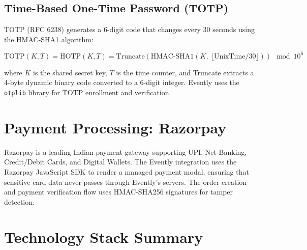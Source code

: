 \documentclass[12pt,a4paper]{report}
\begin{document}
\subsection{Time-Based One-Time Password (TOTP)}
TOTP (RFC 6238) generates a 6-digit code that changes every 30 seconds using the HMAC-SHA1 algorithm:

\begin{equation}
    \text{TOTP}(K, T) = \text{HOTP}(K, T) = \text{Truncate}\left(\text{HMAC-SHA1}(K,\ \lfloor \text{UnixTime} / 30 \rfloor)\right) \mod 10^6
\end{equation}

where $K$ is the shared secret key, $T$ is the time counter, and Truncate extracts a 4-byte dynamic binary code converted to a 6-digit integer. Evently uses the \texttt{otplib} library for TOTP enrollment and verification.

\section{Payment Processing: Razorpay}
Razorpay is a leading Indian payment gateway supporting UPI, Net Banking, Credit/Debit Cards, and Digital Wallets. The Evently integration uses the Razorpay JavaScript SDK to render a managed payment modal, ensuring that sensitive card data never passes through Evently's servers. The order creation and payment verification flow uses HMAC-SHA256 signatures for tamper detection.

\section{Technology Stack Summary}
\end{document}
